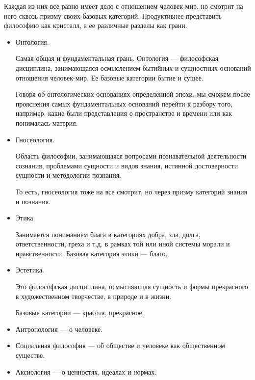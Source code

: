 Каждая из них все равно имеет дело с отношением человек-мир, но смотрит на него сквозь призму
своих базовых категорий. Продуктивнее представить философию как кристалл, а ее различные разделы как грани. 
\begin{itemize}
    \item Онтология.
    
    Самая общая и фундаментальная грань. Онтология --- философская
    дисциплина, занимающаяся осмыслением бытийных и сущностных оснований отношения человек-мир. 
    Ее базовые категории бытие и сущее.
    
    Говоря об
    онтологических основаниях определенной эпохи, мы сможем после прояснения самых
    фундаментальных оснований перейти к разбору того, например, какие были представления о
    пространстве и времени или как понималась материя. 

    \item Гносеология.

    Область философии, занимающаяся вопросами познавательной
    деятельности сознания, проблемами сущности и видов знания, истинной
    достоверности сущности и методологии познания.

    То есть, гносеология тоже на все смотрит, но через призму категорий знания и познания. 

    \item Этика.
    
    Занимается пониманием блага в категориях добра, зла, долга, ответственности, греха и т.д. 
    в рамках той или иной системы морали и нравственности. Базовая категория этики --- благо.

    \item Эстетика.

     Это философская дисциплина, осмысляющая сущность и формы прекрасного в художественном творчестве, в природе и в жизни. 

     Базовые категории --- красота, прекрасное.

     \item Антропология --- о человеке.
     \item Социальная философия --- об обществе и человеке как общественном существе.
     \item Аксиология ---  о ценностях, идеалах и нормах.

     
\end{itemize}

